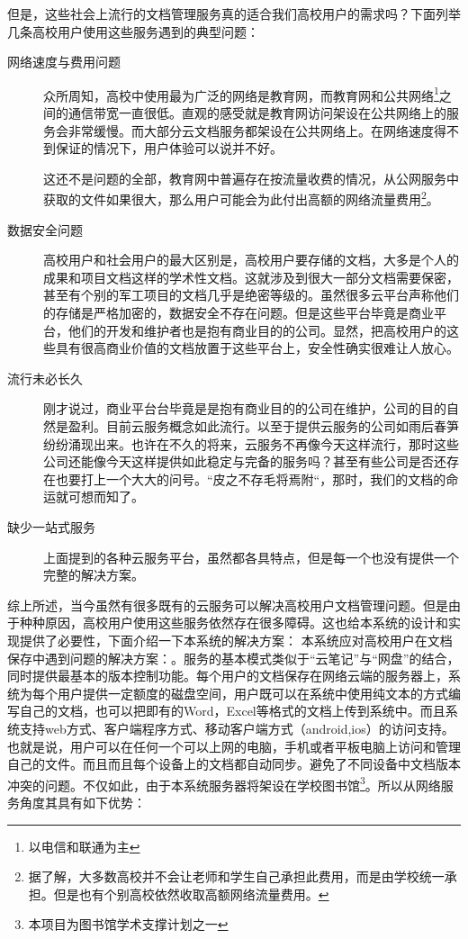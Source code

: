 但是，这些社会上流行的文档管理服务真的适合我们高校用户的需求吗？下面列举几条高校用户使用这些服务遇到的典型问题：
\begin{description}
\item[网络速度与费用问题] 众所周知，高校中使用最为广泛的网络是教育网，而教育网和公共网络\footnote{以电信和联通为主}之间的通信带宽一直很低。直观的感受就是教育网访问架设在公共网络上的服务会非常缓慢。而大部分云文档服务都架设在公共网络上。在网络速度得不到保证的情况下，用户体验可以说并不好。

  这还不是问题的全部，教育网中普遍存在按流量收费的情况，从公网服务中获取的文件如果很大，那么用户可能会为此付出高额的网络流量费用\footnote{据了解，大多数高校并不会让老师和学生自己承担此费用，而是由学校统一承担。但是也有个别高校依然收取高额网络流量费用。}。
\item[数据安全问题] 高校用户和社会用户的最大区别是，高校用户要存储的文档，大多是个人的成果和项目文档这样的学术性文档。这就涉及到很大一部分文档需要保密，甚至有个别的军工项目的文档几乎是绝密等级的。虽然很多云平台声称他们的存储是严格加密的，数据安全不存在问题。但是这些平台毕竟是商业平台，他们的开发和维护者也是抱有商业目的的公司。显然，把高校用户的这些具有很高商业价值的文档放置于这些平台上，安全性确实很难让人放心。
\item[流行未必长久] 刚才说过，商业平台台毕竟是是抱有商业目的的公司在维护，公司的目的自然是盈利。目前云服务概念如此流行。以至于提供云服务的公司如雨后春笋纷纷涌现出来。也许在不久的将来，云服务不再像今天这样流行，那时这些公司还能像今天这样提供如此稳定与完备的服务吗？甚至有些公司是否还存在也要打上一个大大的问号。“皮之不存毛将焉附“，那时，我们的文档的命运就可想而知了。
\item[缺少一站式服务] 上面提到的各种云服务平台，虽然都各具特点，但是每一个也没有提供一个完整的解决方案。
\end{description}
综上所述，当今虽然有很多既有的云服务可以解决高校用户文档管理问题。但是由于种种原因，高校用户使用这些服务依然存在很多障碍。这也给本系统的设计和实现提供了必要性，下面介绍一下本系统的解决方案：
本系统应对高校用户在文档保存中遇到问题的解决方案：。服务的基本模式类似于“云笔记”与“网盘”的结合，同时提供最基本的版本控制功能。每个用户的文档保存在网络云端的服务器上，系统为每个用户提供一定额度的磁盘空间，用户既可以在系统中使用纯文本的方式编写自己的文档，也可以把即有的Word，Excel等格式的文档上传到系统中。而且系统支持web方式、客户端程序方式、移动客户端方式（android,ios）的访问支持。也就是说，用户可以在任何一个可以上网的电脑，手机或者平板电脑上访问和管理自己的文件。而且而且每个设备上的文档都自动同步。避免了不同设备中文档版本冲突的问题。不仅如此，由于本系统服务器将架设在学校图书馆\footnote{本项目为图书馆学术支撑计划之一}。所以从网络服务角度其具有如下优势：
